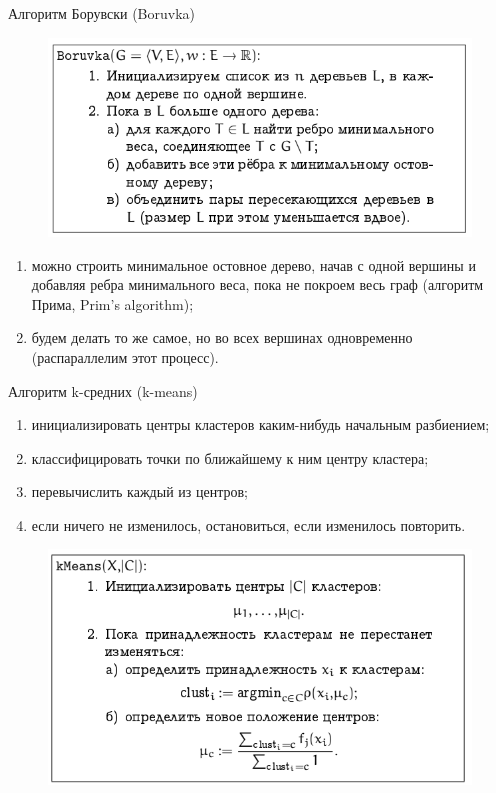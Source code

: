 \documentclass{beamer}
\begin{document}
\begin{frame}{Алгоритм Борувски (Boruvka)}
\begin{figure}[h]
\centering
\includegraphics[scale=0.6]{images/lec07-pic21.png}
\end{figure}
\begin{enumerate}
\item можно строить минимальное остовное дерево, начав с одной вершины и добавляя ребра минимального
веса, пока не покроем весь граф (алгоритм Прима, Prim's algorithm);
\item будем делать то же самое, но во всех вершинах одновременно (распараллелим этот процесс).
\end{enumerate}
\end{frame}

\begin{frame}{Алгоритм k-средних (k-means)}
\begin{enumerate}
\item инициализировать центры кластеров каким-нибудь начальным разбиением; 
\item классифицировать точки по ближайшему к ним центру кластера;
\item перевычислить каждый из центров; 
\item если ничего не изменилось, остановиться, если изменилось  повторить.
\end{enumerate}
\begin{figure}[h]
\centering
\includegraphics[scale=0.45]{images/lec07-pic22.png}
\end{figure}
\end{frame}
\end{document}
